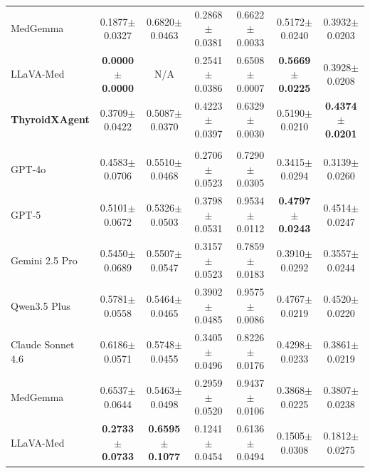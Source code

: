 \documentclass[fleqn,10pt]{wlscirep}
\begin{document}
\begin{appendices}
\begin{table}[p]
\begin{threeparttable}
\begin{tabular}{lcccccc}
MedGemma~\cite{sellergren2025medgemma}
& 0.1877$\pm$0.0327
& 0.6820$\pm$0.0463
& 0.2868$\pm$0.0381
& 0.6622$\pm$0.0033
& 0.5172$\pm$0.0240
& 0.3932$\pm$0.0203 \\

LLaVA-Med~\cite{li_llavamed_2023}
& \textbf{0.0000$\pm$0.0000}\tnote{*}
& N/A\tnote{*}
& 0.2541$\pm$0.0386
& 0.6508$\pm$0.0007
& \textbf{0.5669$\pm$0.0225}
& 0.3928$\pm$0.0208 \\

\rowcolor{lightgray}
\textbf{ThyroidXAgent}
& 0.3709$\pm$0.0422
& 0.5087$\pm$0.0370
& 0.4223$\pm$0.0397
& 0.6329$\pm$0.0030
& 0.5190$\pm$0.0210
& \textbf{0.4374$\pm$0.0201} \\

\midrule

\rowcolor{gray!20}
\multicolumn{7}{c}{\textbf{ZJH-TS Testset} ($n=150$)} \\

GPT-4o~\cite{openai_gpt4_2024}
& 0.4583$\pm$0.0706
& 0.5510$\pm$0.0468
& 0.2706$\pm$0.0523
& 0.7290$\pm$0.0305
& 0.3415$\pm$0.0294
& 0.3139$\pm$0.0260 \\

GPT-5~\cite{openai2025gpt5systemcard}
& 0.5101$\pm$0.0672
& 0.5326$\pm$0.0503
& 0.3798$\pm$0.0531
& 0.9534$\pm$0.0112
& \textbf{0.4797$\pm$0.0243}
& 0.4514$\pm$0.0247 \\

Gemini 2.5 Pro~\cite{comanici_gemini_2025}
& 0.5450$\pm$0.0689
& 0.5507$\pm$0.0547
& 0.3157$\pm$0.0523
& 0.7859$\pm$0.0183
& 0.3910$\pm$0.0292
& 0.3557$\pm$0.0244 \\

Qwen3.5 Plus~\cite{yang_qwen3_2025}
& 0.5781$\pm$0.0558
& 0.5464$\pm$0.0465
& 0.3902$\pm$0.0485
& 0.9575$\pm$0.0086
& 0.4767$\pm$0.0219
& 0.4520$\pm$0.0220 \\

Claude Sonnet 4.6
& 0.6186$\pm$0.0571
& 0.5748$\pm$0.0455
& 0.3405$\pm$0.0496
& 0.8226$\pm$0.0176
& 0.4298$\pm$0.0233
& 0.3861$\pm$0.0219 \\

MedGemma~\cite{sellergren2025medgemma}
& 0.6537$\pm$0.0644
& 0.5463$\pm$0.0498
& 0.2959$\pm$0.0520
& 0.9437$\pm$0.0106
& 0.3868$\pm$0.0225
& 0.3807$\pm$0.0238 \\

LLaVA-Med~\cite{li_llavamed_2023}
& \textbf{0.2733$\pm$0.0733}
& \textbf{0.6595$\pm$0.1077}
& 0.1241$\pm$0.0454
& 0.6136$\pm$0.0494
& 0.1505$\pm$0.0308
& 0.1812$\pm$0.0275 \\


\end{tabular}
\end{threeparttable}
\end{table}
\end{appendices}
\end{document}
